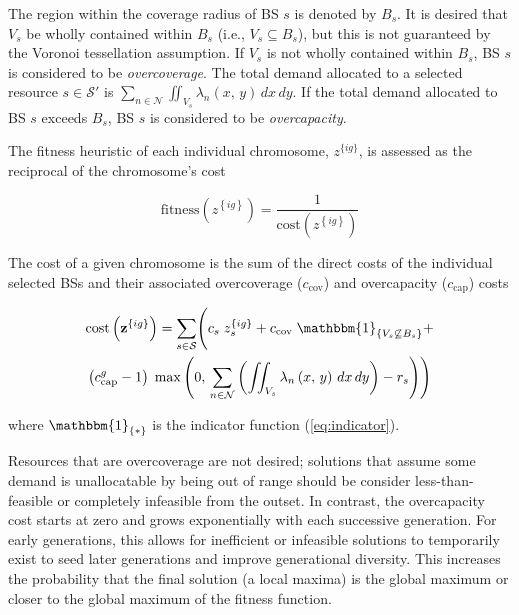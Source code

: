 \documentclass[12pt,dvipsnames]{report}
\newcommand{\ind}[1]{\mathbbm{1}_{\left\{ #1 \right\}}}
\begin{document}
The region within the coverage radius of BS $s$ is denoted by $B_s$.  It is desired that $V_s$ be wholly contained within $B_s$ (i.e., $V_s \subseteq B_s$), but this is not guaranteed by the Voronoi tessellation assumption.  If $V_s$ is not wholly contained within $B_s$, BS $s$ is considered to be \emph{overcoverage}.  The total demand allocated to a selected resource $s \in \mathcal{S}'$ is $\sum_{n \in \mathcal{N}} \iint_{V_s} \lambda_n \left( x,\, y \right) \,dx \,dy$.  If the total demand allocated to BS $s$ exceeds $B_s$, BS $s$ is considered to be \emph{overcapacity}.

The fitness heuristic of each individual chromosome, $z^{\{ig\}}$, is assessed as the reciprocal of the chromosome's cost

\begin{equation} \label{eq:GAFit}
\mathrm{fitness}\left( z^{\left\{ ig \right\}} \right) = \frac{1}{\mathrm{cost}\left( z^{\left\{ ig \right\}} \right)}
\end{equation}

The cost of a given chromosome is the sum of the direct costs of the individual selected BSs and their associated overcoverage ($c_{\text{cov}}$) and overcapacity ($c_{\text{cap}}$) costs

\begin{multline} \label{eq:GACost}
\mathrm{cost}\left( \textbf{z}^{\left\{ ig \right\}} \right) = \sum_{s \in \mathcal{S}} \Biggl( c_s \; z_s^{\left\{ ig \right\}} + c_\text{cov} \; \ind{V_s \not\subseteq B_s} + \\ \left( c_\text{cap}^g - 1 \right) \; \max\left( 0,\, \sum_{n \in \mathcal{N}} \left( \iint_{V_s} \lambda_n\left( x,\, y \right)\, dx\, dy \right) - r_s \right) \Biggr)
\end{multline}

\noindent where $\ind{*}$ is the indicator function (\cref{eq:indicator}).

Resources that are overcoverage are not desired; solutions that assume some demand is unallocatable by being out of range should be consider less-than-feasible or completely infeasible from the outset.  In contrast, the overcapacity cost starts at zero and grows exponentially with each successive generation.  For early generations, this allows for inefficient or infeasible solutions to temporarily exist to seed later generations and improve generational diversity.  This increases the probability that the final solution (a local maxima) is the global maximum or closer to the global maximum of the fitness function.
\end{document}

